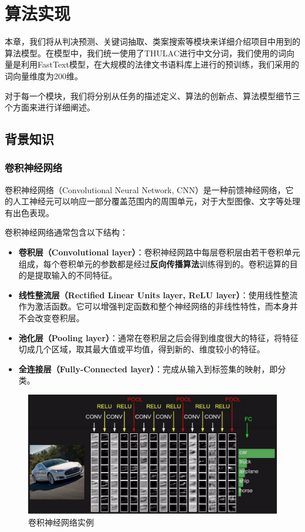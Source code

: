 \chapter{算法实现}
本章，我们将从判决预测、关键词抽取、类案搜索等模块来详细介绍项目中用到的算法模型。在模型中，我们统一使用了THULAC进行中文分词，我们使用的词向量是利用FastText模型，在大规模的法律文书语料库上进行的预训练，我们采用的词向量维度为200维。

对于每一个模块，我们将分别从任务的描述定义、算法的创新点、算法模型细节三个方面来进行详细阐述。

\section{背景知识}
\subsection{卷积神经网络}
卷积神经网络（Convolutional Neural Network, CNN）是一种前馈神经网络，它的人工神经元可以响应一部分覆盖范围内的周围单元，对于大型图像、文字等处理有出色表现。

卷积神经网络通常包含以下结构：

\begin{itemize}
	\item \textbf{卷积层（Convolutional layer）}：卷积神经网路中每层卷积层由若干卷积单元组成，每个卷积单元的参数都是经过\textbf{反向传播算法}训练得到的。卷积运算的目的是提取输入的不同特征。
	\item \textbf{线性整流层（Rectified Linear Units layer, ReLU layer）}：使用线性整流作为激活函数。它可以增强判定函数和整个神经网络的非线性特性，而本身并不会改变卷积层。
	\item \textbf{池化层（Pooling layer）}：通常在卷积层之后会得到维度很大的特征，将特征切成几个区域，取其最大值或平均值，得到新的、维度较小的特征。
	\item \textbf{全连接层（Fully-Connected layer）}：完成从输入到标签集的映射，即分类。
\end{itemize}

\begin{figure}[h]
    \centering
    \includegraphics[width=\linewidth]{figures/cnn1}
    \caption{卷积神经网络实例}
    \label{fig:cnn1}
\end{figure}

